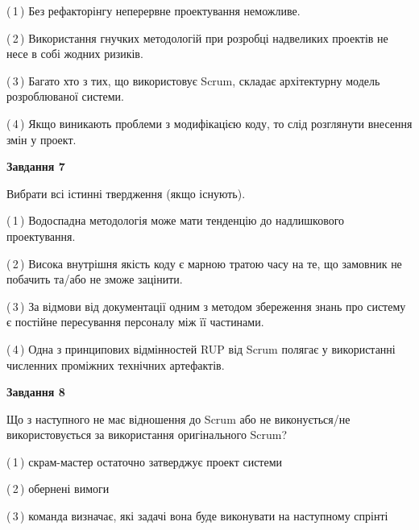 \documentclass[10pt, ukrainian]{article}
\begin{document}
{\begin {large}
(\,1\,) Без рефакторінгу неперервне проектування неможливе. %



(\,2\,) Використання гнучких методологій при розробці надвеликих проектів не несе в собі жодних ризиків. %



(\,3\,) Багато хто з тих, що використовує Scrum, складає архітектурну модель розроблюваної системи. %



(\,4\,) Якщо виникають проблеми з модифікацією коду, то слід розглянути внесення змін у проект. %


{\begin {center}\textbf{Завдання 7}\end {center}}\par
Вибрати всі істинні твердження (якщо існують).\par
\vspace{2mm}



(\,1\,) Водоспадна методологія може мати тенденцію до надлишкового проектування. %



(\,2\,) Висока внутрішня якість коду є марною тратою часу на те, що замовник не побачить та/або не зможе зацінити. %



(\,3\,) За відмови від документації одним з методом збереження знань про систему є постійне пересування персоналу між її частинами. %



(\,4\,) Одна з принципових відмінностей RUP від Scrum полягає у використанні численних проміжних технічних артефактів. %


{\begin {center}\textbf{Завдання 8}\end {center}}\par
Що з наступного не має відношення до Scrum або не виконується/не використовується за використання оригінального Scrum?\par
\vspace{2mm}



(\,1\,) скрам-мастер остаточно затверджує проект системи%



(\,2\,) обернені вимоги%



(\,3\,) команда визначає, які задачі вона буде виконувати на наступному спрінті%




\end{large}}
\end{document}
